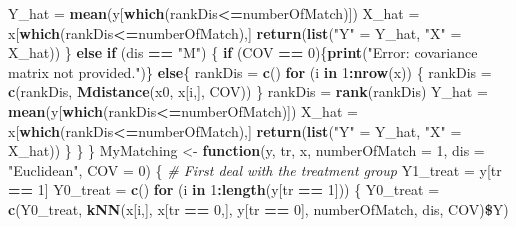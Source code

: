 \documentclass[]{article}
\newenvironment{Shaded}{\begin{snugshade}}{\end{snugshade}}
\newcommand{\KeywordTok}[1]{\textcolor[rgb]{0.13,0.29,0.53}{\textbf{#1}}}
\newcommand{\DataTypeTok}[1]{\textcolor[rgb]{0.13,0.29,0.53}{#1}}
\newcommand{\DecValTok}[1]{\textcolor[rgb]{0.00,0.00,0.81}{#1}}
\newcommand{\StringTok}[1]{\textcolor[rgb]{0.31,0.60,0.02}{#1}}
\newcommand{\CommentTok}[1]{\textcolor[rgb]{0.56,0.35,0.01}{\textit{#1}}}
\newcommand{\ControlFlowTok}[1]{\textcolor[rgb]{0.13,0.29,0.53}{\textbf{#1}}}
\newcommand{\OperatorTok}[1]{\textcolor[rgb]{0.81,0.36,0.00}{\textbf{#1}}}
\newcommand{\NormalTok}[1]{#1}
\begin{document}
\begin{Shaded}
\begin{Highlighting}[]
\NormalTok{    Y_hat =}\StringTok{ }\KeywordTok{mean}\NormalTok{(y[}\KeywordTok{which}\NormalTok{(rankDis}\OperatorTok{<=}\NormalTok{numberOfMatch)])}
\NormalTok{    X_hat =}\StringTok{ }\NormalTok{x[}\KeywordTok{which}\NormalTok{(rankDis}\OperatorTok{<=}\NormalTok{numberOfMatch),]}
    \KeywordTok{return}\NormalTok{(}\KeywordTok{list}\NormalTok{(}\StringTok{"Y"}\NormalTok{ =}\StringTok{ }\NormalTok{Y_hat, }\StringTok{"X"}\NormalTok{ =}\StringTok{ }\NormalTok{X_hat))}
\NormalTok{  \}}
  \ControlFlowTok{else} \ControlFlowTok{if}\NormalTok{ (dis }\OperatorTok{==}\StringTok{ "M"}\NormalTok{)}
\NormalTok{  \{}
    \ControlFlowTok{if}\NormalTok{ (COV }\OperatorTok{==}\StringTok{ }\DecValTok{0}\NormalTok{)\{}\KeywordTok{print}\NormalTok{(}\StringTok{"Error: covariance matrix not provided."}\NormalTok{)\}}
    \ControlFlowTok{else}\NormalTok{\{}
\NormalTok{      rankDis =}\StringTok{ }\KeywordTok{c}\NormalTok{()}
      \ControlFlowTok{for}\NormalTok{ (i }\ControlFlowTok{in} \DecValTok{1}\OperatorTok{:}\KeywordTok{nrow}\NormalTok{(x))}
\NormalTok{      \{}
\NormalTok{        rankDis =}\StringTok{ }\KeywordTok{c}\NormalTok{(rankDis, }\KeywordTok{Mdistance}\NormalTok{(x0, x[i,], COV))}
\NormalTok{      \}}
\NormalTok{      rankDis =}\StringTok{ }\KeywordTok{rank}\NormalTok{(rankDis)}
\NormalTok{      Y_hat =}\StringTok{ }\KeywordTok{mean}\NormalTok{(y[}\KeywordTok{which}\NormalTok{(rankDis}\OperatorTok{<=}\NormalTok{numberOfMatch)])}
\NormalTok{      X_hat =}\StringTok{ }\NormalTok{x[}\KeywordTok{which}\NormalTok{(rankDis}\OperatorTok{<=}\NormalTok{numberOfMatch),]}
      \KeywordTok{return}\NormalTok{(}\KeywordTok{list}\NormalTok{(}\StringTok{"Y"}\NormalTok{ =}\StringTok{ }\NormalTok{Y_hat, }\StringTok{"X"}\NormalTok{ =}\StringTok{ }\NormalTok{X_hat))}
\NormalTok{    \}}
\NormalTok{  \}}
\NormalTok{\}}
\NormalTok{MyMatching <-}\StringTok{ }\ControlFlowTok{function}\NormalTok{(y, tr, x, }\DataTypeTok{numberOfMatch =} \DecValTok{1}\NormalTok{, }\DataTypeTok{dis =} \StringTok{"Euclidean"}\NormalTok{, }\DataTypeTok{COV =} \DecValTok{0}\NormalTok{)}
\NormalTok{\{}
  \CommentTok{# First deal with the treatment group}
\NormalTok{  Y1_treat =}\StringTok{ }\NormalTok{y[tr }\OperatorTok{==}\StringTok{ }\DecValTok{1}\NormalTok{]}
\NormalTok{  Y0_treat =}\StringTok{ }\KeywordTok{c}\NormalTok{()}
  \ControlFlowTok{for}\NormalTok{ (i }\ControlFlowTok{in} \DecValTok{1}\OperatorTok{:}\KeywordTok{length}\NormalTok{(y[tr }\OperatorTok{==}\StringTok{ }\DecValTok{1}\NormalTok{]))}
\NormalTok{  \{}
\NormalTok{    Y0_treat =}\StringTok{ }\KeywordTok{c}\NormalTok{(Y0_treat, }\KeywordTok{kNN}\NormalTok{(x[i,], x[tr }\OperatorTok{==}\StringTok{ }\DecValTok{0}\NormalTok{,], y[tr }\OperatorTok{==}\StringTok{ }\DecValTok{0}\NormalTok{], numberOfMatch, dis, COV)}\OperatorTok{\$}\NormalTok{Y)}

\end{Highlighting}
\end{Shaded}
\end{document}

